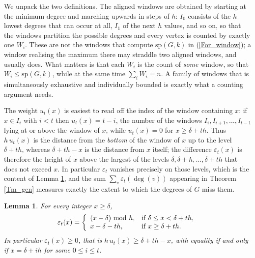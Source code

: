 \documentclass[12pt,a4paper]{article}%
\newtheorem{lemma}[theorem]{Lemma}
\begin{document}
We unpack the two definitions. The aligned windows are obtained by starting at
the minimum degree and marching upwards in steps of $h$: $I_{0}$ consists of the
$h$ lowest degrees that can occur at all, $I_{1}$ of the next $h$ values, and so
on, so that the windows partition the possible degrees and every vertex is
counted by exactly one $W_{i}$. These are not the windows that compute
$\mathrm{sp}(G,k)$ in (\ref{For_window}); a window realising the maximum there
may straddle two aligned windows, and usually does. What matters is that each
$W_{i}$ is the count of \emph{some} window, so that $W_{i}\leq \mathrm{sp}(G,k)$,
while at the same time $\sum_{i}W_{i}=n$. A family of windows that is
simultaneously exhaustive and individually bounded is exactly what a counting
argument needs.

The weight $u_{t}(x)$ is easiest to read off the index of the window containing
$x$: if $x\in I_{i}$ with $i<t$ then $u_{t}(x)=t-i$, the number of the windows
$I_{i},I_{i+1},\ldots ,I_{t-1}$ lying at or above the window of $x$, while
$u_{t}(x)=0$ for $x\geq \delta +th$. Thus $h\,u_{t}(x)$ is the distance from the
\emph{bottom} of the window of $x$ up to the level $\delta +th$, whereas
$\delta +th-x$ is the distance from $x$ itself; the difference
$\varepsilon _{t}(x)$ is therefore the height of $x$ above the largest of the
levels $\delta ,\delta +h,\ldots ,\delta +th$ that does not exceed $x$. In
particular $\varepsilon _{t}$ vanishes precisely on those levels, which is the
content of Lemma \ref{Lemma_gen}, and the sum $\sum_{v}\varepsilon _{t}(\deg
(v))$ appearing in Theorem \ref{Tm_gen} measures exactly the extent to which the
degrees of $G$ miss them.



\begin{lemma}
\label{Lemma_gen}For every integer $x\geq \delta $,
\[
\varepsilon _{t}(x)=\left\{
\begin{array}
[c]{ll}%
(x-\delta )\ \mathrm{mod}\ h, & \text{if }\delta \leq x<\delta +th,\\
x-\delta -th, & \text{if }x\geq \delta +th.
\end{array}
\right.
\]
In particular $\varepsilon _{t}(x)\geq 0$, that is $h\,u_{t}(x)\geq \delta +th-x$, with equality if
and only if $x=\delta +ih$ for some $0\leq i\leq t$.
\end{lemma}
\end{document}
